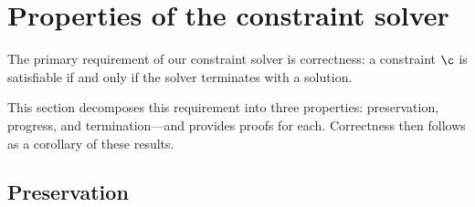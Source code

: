 \documentclass[acmsmall,screen,nonacm%
\Anonymous{,anonymous}{}%
\Final{}{,review}%
]{acmart}
\begin{document}
%
%
%
%

\section{Properties of the constraint solver}
\label{app:proofs-solving}

The primary requirement of our constraint solver is correctness:
a constraint $\c$ is satisfiable if and only if the solver terminates with a solution.

This section decomposes this requirement into three properties: preservation,
progress, and termination---and provides proofs for each. Correctness then
follows as a corollary of these results.

\subsection{Preservation}
\end{document}
